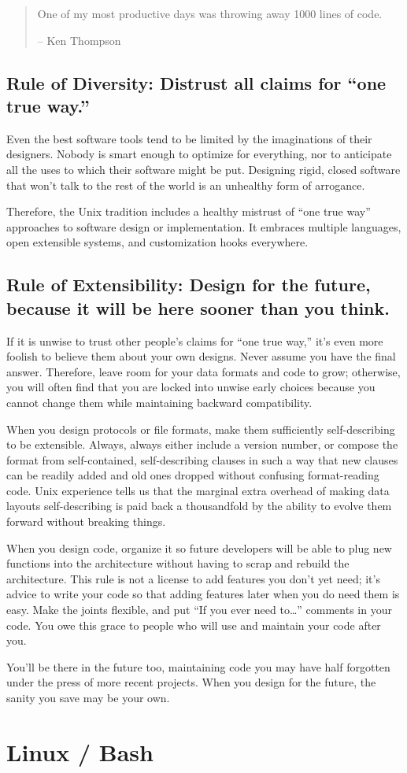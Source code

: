 \documentclass[10pt,twoside,openright]{memoir}
\begin{document}
\begin{quote}
One of my most productive days was throwing away 1000 lines of code.

-- Ken Thompson
\end{quote}

\section{Rule of Diversity: Distrust all claims for ``one true way.''}

Even the best software tools tend to be limited by the imaginations of their designers. Nobody is smart enough to optimize for everything, nor to anticipate all the uses to which their software might be put. Designing rigid, closed software that won't talk to the rest of the world is an unhealthy form of arrogance.

Therefore, the Unix tradition includes a healthy mistrust of ``one true way'' approaches to software design or implementation. It embraces multiple languages, open extensible systems, and customization hooks everywhere.

\section{Rule of Extensibility: Design for the future, because it will be here sooner than you think.}

If it is unwise to trust other people's claims for ``one true way,'' it's even more foolish to believe them about your own designs. Never assume you have the final answer. Therefore, leave room for your data formats and code to grow; otherwise, you will often find that you are locked into unwise early choices because you cannot change them while maintaining backward compatibility.

When you design protocols or file formats, make them sufficiently self-describing to be extensible. Always, always either include a version number, or compose the format from self-contained, self-describing clauses in such a way that new clauses can be readily added and old ones dropped without confusing format-reading code. Unix experience tells us that the marginal extra overhead of making data layouts self-describing is paid back a thousandfold by the ability to evolve them forward without breaking things.

When you design code, organize it so future developers will be able to plug new functions into the architecture without having to scrap and rebuild the architecture. This rule is not a license to add features you don't yet need; it's advice to write your code so that adding features later when you do need them is easy. Make the joints flexible, and put ``If you ever need to\dots'' comments in your code. You owe this grace to people who will use and maintain your code after you.

You'll be there in the future too, maintaining code you may have half forgotten under the press of more recent projects. When you design for the future, the sanity you save may be your own.


\chapter{Linux / Bash}
\end{document}

